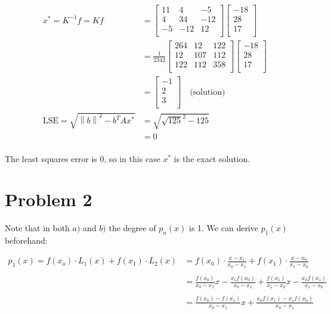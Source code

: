 \documentclass[10pt,letter]{article}
\newcommand\norm[1]{\left\lVert#1\right\rVert}
\begin{document}
\begin{align*}
x^* = K^{-1} f = K f &=
\left[ {\begin{array}{ccc}
 11 & 4  & -5 \\
 4 & 34  & -12 \\
 -5 & -12  & 12 \\
\end{array} } \right]
\left[ {\begin{array}{c}
 -18 \\
 28 \\
 17 \\
\end{array} } \right]
\\ &= \frac{1}{2342}
\left[ {\begin{array}{ccc}
 264 & 12 & 122 \\
 12 & 107 & 112 \\
 122 & 112  & 358 \\
\end{array} } \right]
\left[ {\begin{array}{c}
 -18 \\
 28 \\
 17 \\
\end{array} } \right]
\\ &=
\left[ {\begin{array}{c}
 -1 \\
 2 \\
 3 \\
\end{array} } \right]
\quad \textrm{(solution)}
\\ \textrm{LSE} = \sqrt{\norm{b}^2 - b^T A x^*} &= \sqrt{\sqrt{125}^2 - 125}
\\ &= 0\\
\end{align*}

The least squares error is $0$, so in this case $x^*$ is the exact solution.

\section*{Problem 2}

Note that in both $a)$ and $b)$ the degree of $p_n(x)$ is 1. We can derive $p_1(x)$ beforehand:

\begin{align*}
p_1(x) = f(x_o) \cdot L_1(x) + f(x_1) \cdot L_2(x) &= f(x_0) \cdot \frac{x - x_1}{x_0 - x_1} + f(x_1) \cdot \frac{x - x_0}{x_1 - x_0}
\\\\
&= \frac{f(x_0)}{x_0 - x_1} x - \frac{x_1 f(x_0)}{x_0 - x_1}
+ \frac{f(x_1)}{x_1 - x_0} x - \frac{x_0 f(x_1)}{x_1 - x_0}
\\\\
&= \frac{f(x_0) - f(x_1)}{x_0 - x_1} x + \frac{x_0 f(x_1) - x_1 f(x_0)}{x_0 - x_1}
\end{align*}
\end{document}
